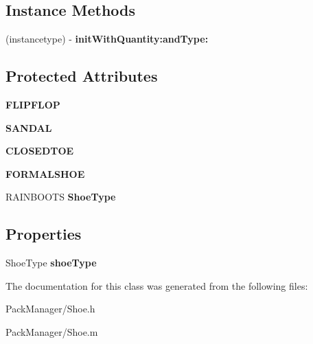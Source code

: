 \subsection*{Instance Methods}
\begin{DoxyCompactItemize}
\item 
\hypertarget{interface_shoe_a999234118d061a4f58c63d561169602a}{(instancetype) -\/ {\bfseries init\-With\-Quantity\-:and\-Type\-:}}\label{interface_shoe_a999234118d061a4f58c63d561169602a}

\end{DoxyCompactItemize}
\subsection*{Protected Attributes}
\begin{DoxyCompactItemize}
\item 
\hypertarget{interface_shoe_a20595e374d605ab93ba54f9304458c19}{{\bfseries F\-L\-I\-P\-F\-L\-O\-P}}\label{interface_shoe_a20595e374d605ab93ba54f9304458c19}

\item 
\hypertarget{interface_shoe_a107a0fe5a37146786f37f2ef641f3e89}{{\bfseries S\-A\-N\-D\-A\-L}}\label{interface_shoe_a107a0fe5a37146786f37f2ef641f3e89}

\item 
\hypertarget{interface_shoe_af3b751d906629b5a72c9b89a85c9c67b}{{\bfseries C\-L\-O\-S\-E\-D\-T\-O\-E}}\label{interface_shoe_af3b751d906629b5a72c9b89a85c9c67b}

\item 
\hypertarget{interface_shoe_ad572ae68a3eccab4c433109b7f6cdd42}{{\bfseries F\-O\-R\-M\-A\-L\-S\-H\-O\-E}}\label{interface_shoe_ad572ae68a3eccab4c433109b7f6cdd42}

\item 
\hypertarget{interface_shoe_ac002d3c88b877b8b1c7b11eb82ac93f6}{R\-A\-I\-N\-B\-O\-O\-T\-S {\bfseries Shoe\-Type}}\label{interface_shoe_ac002d3c88b877b8b1c7b11eb82ac93f6}

\end{DoxyCompactItemize}
\subsection*{Properties}
\begin{DoxyCompactItemize}
\item 
\hypertarget{interface_shoe_ade95c853c0a7a91a7ca9d5829764bfda}{Shoe\-Type {\bfseries shoe\-Type}}\label{interface_shoe_ade95c853c0a7a91a7ca9d5829764bfda}

\end{DoxyCompactItemize}


The documentation for this class was generated from the following files\-:\begin{DoxyCompactItemize}
\item 
Pack\-Manager/Shoe.\-h\item 
Pack\-Manager/Shoe.\-m\end{DoxyCompactItemize}
